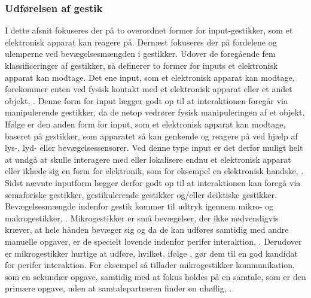 \subsubsection{Udførelsen af gestik}
\label{UdfoerelseAfGestik}
%
I dette afsnit fokuseres der på to overordnet former for input-gestikker, som et elektronisk apparat kan reagere på. Dernæst fokuseres der på fordelene og ulemperne ved bevægelsesmængden i gestikker.\blankline
%
Udover de foregående fem klassificeringer af gestikker, så definerer \textcite[s. 9]{PDF:ATaxonomyOfGestures} to former for inputs et elektronisk apparat kan modtage. Det ene input, som et elektronisk apparat kan modtage, forekommer enten ved fysisk kontakt med et elektronisk apparat eller et andet objekt, \parencite[s. 10]{PDF:ATaxonomyOfGestures}. Denne form for input lægger godt op til at interaktionen foregår via manipulerende gestikker, da de netop vedrører fysisk manipuleringen af et objekt. Ifølge \textcite[s. 12]{PDF:ATaxonomyOfGestures} er den anden form for input, som et elektronisk apparat kan modtage, baseret på gestikker, som apparatet så kan genkende og reagere på ved hjælp af lys-, lyd- eller bevægelsessensorer. Ved denne type input er det derfor muligt helt at undgå at skulle interagere med eller lokalisere endnu et elektronisk apparat eller iklæde sig en form for elektronik, som for eksempel en elektronisk handske, \parencite[s. 12]{PDF:ATaxonomyOfGestures}. Sidst nævnte inputform lægger derfor godt op til at interaktionen kan foregå via semaforiske gestikker, gestikulerende gestikker og/eller deiktiske gestikker. \blankline
%
Bevægelsesmængde indenfor gestik kommer til udtryk igennem mikro- og makrogestikker, \parencite[s. 6]{PDF:UsabilityofMicroVsMacroGestures}. Mikrogestikker er små bevægelser, der ikke nødvendigvis kræver, at hele hånden bevæger sig og da de kan udføres samtidig med andre manuelle opgaver, er de specielt lovende indenfor perifer interaktion, \parencite[s. 95]{PDF:PIMicrogesturesKap5}. Derudover er mikrogestikker hurtige at udføre, hvilket, ifølge \textcite[s. 96]{PDF:PIMicrogesturesKap5}, gør dem til en god kandidat for perifer interaktion. For eksempel så tillader mikrogestikker kommunikation, som en sekundær opgave, samtidig med at fokus holdes på en samtale, som er den primære opgave, uden at samtalepartneren finder en uhøflig, \parencite[s. 97]{PDF:PIMicrogesturesKap5}.

